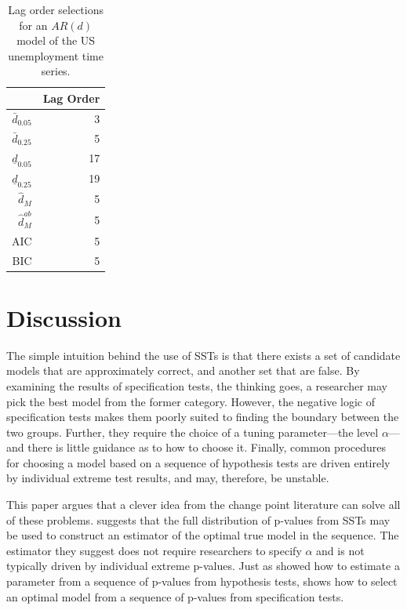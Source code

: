 \documentclass[12pt]{article}\usepackage[]{graphicx}\usepackage[]{color}
\newcommand{\dhatm}{\hat{d}_M}
\newcommand{\dhatmab}{\hat{d}^{ab}_M}
\begin{document}
\begin{table}[ht]
\centering
\begin{tabular}{rr}
  \hline
 & Lag Order \\ 
  \hline
$\bar{d}_{0.05}$ &   3 \\ 
  $\bar{d}_{0.25}$ &   5 \\ 
  $\underline{d}_{0.05}$ &  17 \\ 
  $\underline{d}_{0.25}$ &  19 \\ 
  $\dhatm$ &   5 \\ 
  $\dhatmab$ &   5 \\ 
  AIC &   5 \\ 
  BIC &   5 \\ 
   \hline
\end{tabular}
\caption{Lag order selections for an $AR(d)$ model of the US unemployment time series.} 
\label{tab:ts}
\end{table}


\section{Discussion}\label{sec:discussion}
The simple intuition behind the use of SSTs is that there exists a set
of candidate models that are approximately correct, and another set
that are false.
By examining the results of specification tests, the thinking goes, a
researcher may pick the best model from the former category.
However, the negative logic of specification tests makes them poorly
suited to finding the boundary between the two groups.
Further, they require the choice of a tuning parameter---the level
$\alpha$---and there is little guidance as to how to choose it.
Finally, common procedures for choosing a model based on a sequence of
hypothesis tests are driven entirely by individual extreme test
results, and may, therefore, be unstable.

This paper argues that a clever idea from the change point literature
can solve all of these problems.
\citet{mallik} suggests that the full distribution of p-values from
SSTs may be used to construct an estimator of the optimal true model
in the sequence.
The estimator they suggest does not require researchers to specify
$\alpha$ and is not typically driven by individual extreme p-values.
Just as \citet{hodgeslehmann} showed how to estimate a parameter from
a sequence of p-values from hypothesis tests, \citet{mallik} shows how
to select an optimal model from a sequence of p-values from
specification tests.
\end{document}

